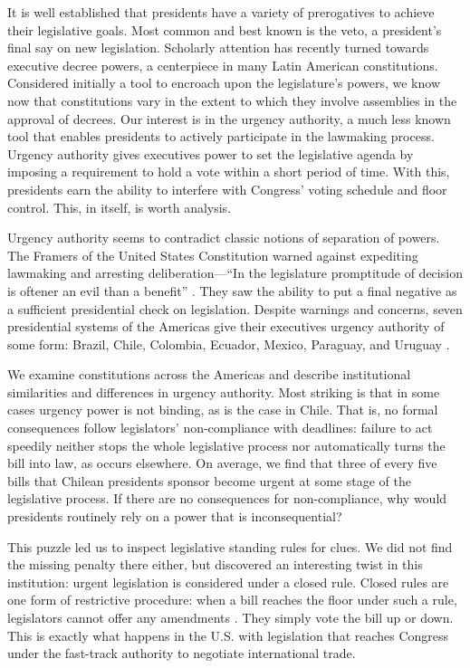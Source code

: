 \documentclass[letter,12pt]{article}
\begin{document}
\noindent It is well established that presidents have a variety of prerogatives to achieve their legislative goals. Most common and best known is the veto, a president's final say on new legislation. Scholarly attention has recently turned towards executive decree powers, a centerpiece in many Latin American constitutions. Considered initially a tool to encroach upon the legislature's powers, we know now that constitutions vary in the extent to which they involve assemblies in the approval of decrees. Our interest is in the urgency authority, a much less known tool that enables presidents to actively participate in the lawmaking process. Urgency authority gives executives power to set the legislative agenda by imposing a requirement to hold a vote within a short period of time. With this, presidents earn the ability to interfere with Congress' voting schedule and floor control. This, in itself, is worth analysis.

Urgency authority seems to contradict classic notions of separation of powers. The Framers of the United States Constitution warned against expediting lawmaking and arresting deliberation---``In the legislature promptitude of decision is oftener an evil than a benefit'' \citep[][, LXX]{hamilton70.1788}. They saw the ability to put a final negative as a sufficient presidential check on legislation. Despite warnings and concerns, seven presidential systems of the Americas give their executives urgency authority of some form: Brazil, Chile, Colombia, Ecuador, Mexico, Paraguay, and Uruguay \citep{morgenstern.nacif.2002,garcia.montero.presidentes.2009}.

We examine constitutions across the Americas and describe institutional similarities and differences in urgency authority. Most striking is that in some cases urgency power is not binding, as is the case in Chile. That is, no formal consequences follow legislators' non-compliance with deadlines: failure to act speedily neither stops the whole legislative process nor automatically turns the bill into law, as occurs elsewhere. On average, we find that three of every five bills that Chilean presidents sponsor become urgent at some stage of the legislative process. If there are no consequences for non-compliance, why would presidents routinely rely on a power that is inconsequential?

This puzzle led us to inspect legislative standing rules for clues. We did not find the missing penalty there either, but discovered an interesting twist in this institution: urgent legislation is considered under a closed rule. Closed rules are one form of restrictive procedure: when a bill reaches the floor under such a rule, legislators cannot offer any amendments \citep{oleszek.2001}. They simply vote the bill up or down. This is exactly what happens in the U.S. with legislation that reaches Congress under the fast-track authority to negotiate international trade.
\end{document}
